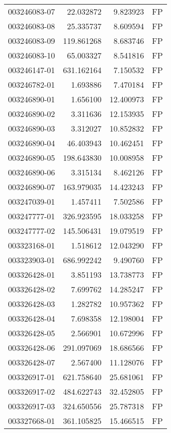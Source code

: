 \begin{tabular}{lrrl}
003246083-07 &   22.032872 &     9.823923 &   FP \\
003246083-08 &   25.335737 &     8.609594 &   FP \\
003246083-09 &  119.861268 &     8.683746 &   FP \\
003246083-10 &   65.003327 &     8.541816 &   FP \\
003246147-01 &  631.162164 &     7.150532 &   FP \\
003246782-01 &    1.693886 &     7.470184 &   FP \\
003246890-01 &    1.656100 &    12.400973 &   FP \\
003246890-02 &    3.311636 &    12.153935 &   FP \\
003246890-03 &    3.312027 &    10.852832 &   FP \\
003246890-04 &   46.403943 &    10.462451 &   FP \\
003246890-05 &  198.643830 &    10.008958 &   FP \\
003246890-06 &    3.315134 &     8.462126 &   FP \\
003246890-07 &  163.979035 &    14.423243 &   FP \\
003247039-01 &    1.457411 &     7.502586 &   FP \\
003247777-01 &  326.923595 &    18.033258 &   FP \\
003247777-02 &  145.506431 &    19.079519 &   FP \\
003323168-01 &    1.518612 &    12.043290 &   FP \\
003323903-01 &  686.992242 &     9.490760 &   FP \\
003326428-01 &    3.851193 &    13.738773 &   FP \\
003326428-02 &    7.699762 &    14.285247 &   FP \\
003326428-03 &    1.282782 &    10.957362 &   FP \\
003326428-04 &    7.698358 &    12.198004 &   FP \\
003326428-05 &    2.566901 &    10.672996 &   FP \\
003326428-06 &  291.097069 &    18.686566 &   FP \\
003326428-07 &    2.567400 &    11.128076 &   FP \\
003326917-01 &  621.758640 &    25.681061 &   FP \\
003326917-02 &  484.622743 &    32.452805 &   FP \\
003326917-03 &  324.650556 &    25.787318 &   FP \\
003327668-01 &  361.105825 &    15.466515 &   FP \\

\end{tabular}
